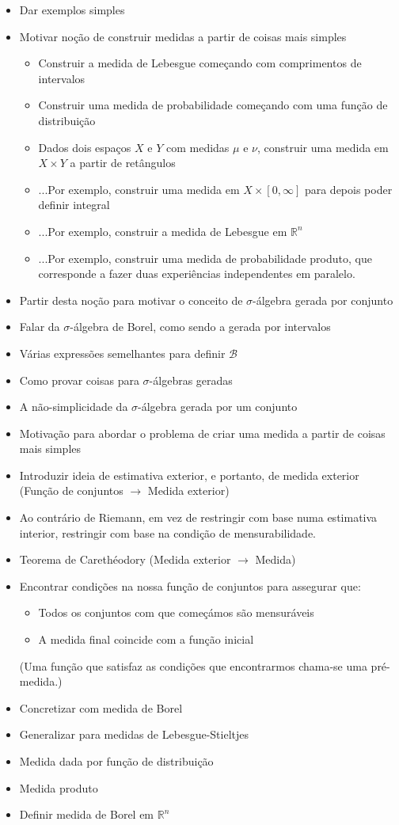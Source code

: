 \documentclass{article}
\newcommand{\R}{\mathbb{R}}
\begin{document}
\begin{itemize}
\item Dar exemplos simples
\item Motivar noção de construir medidas a partir de coisas mais simples
\begin{itemize}
\item Construir a medida de Lebesgue começando com comprimentos de intervalos
\item Construir uma medida de probabilidade começando com uma função de distribuição
\item Dados dois espaços $X$ e $Y$ com medidas $\mu$ e $\nu$, construir uma medida em $X \times Y$ a partir de retângulos
\item ...Por exemplo, construir uma medida em $X \times \left[0,\infty\right]$ para depois poder definir integral
\item ...Por exemplo, construir a medida de Lebesgue em $\R^n$
\item ...Por exemplo, construir uma medida de probabilidade produto, que corresponde a fazer duas experiências independentes em paralelo.
\end{itemize}
\item Partir desta noção para motivar o conceito de $\sigma$-álgebra gerada por conjunto
\item Falar da $\sigma$-álgebra de Borel, como sendo a gerada por intervalos
\item Várias expressões semelhantes para definir $\mathcal{B}$
\item Como provar coisas para $\sigma$-álgebras geradas
\item A não-simplicidade da $\sigma$-álgebra gerada por um conjunto
\item Motivação para abordar o problema de criar uma medida a partir de coisas mais simples
\item Introduzir ideia de estimativa exterior, e portanto, de medida exterior (Função de conjuntos $\to$ Medida exterior)
\item Ao contrário de Riemann, em vez de restringir com base numa estimativa interior, restringir com base na condição de mensurabilidade.
\item Teorema de Carethéodory (Medida exterior $\to$ Medida)
\item Encontrar condições na nossa função de conjuntos para assegurar que:
\begin{itemize}
\item Todos os conjuntos com que começámos são mensuráveis
\item A medida final coincide com a função inicial
\end{itemize}
(Uma função que satisfaz as condições que encontrarmos chama-se uma pré-medida.)
\item Concretizar com medida de Borel
\item Generalizar para medidas de Lebesgue-Stieltjes
\item Medida dada por função de distribuição
\item Medida produto
\item Definir medida de Borel em $\R^n$


\end{itemize}
\end{document}
